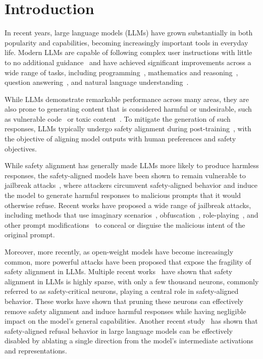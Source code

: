 \section{Introduction}

In recent years, large language models (LLMs) have grown substantially in both popularity and capabilities, becoming increasingly important tools in everyday life. Modern LLMs are capable of following complex user instructions with little to no additional guidance~\cite{brown2020fewshotlearners, wei2022finetuned} and have achieved significant improvements across a wide range of tasks, including programming~\cite{Chen2021EvaluatingLL}, mathematics and reasoning~\cite{mathds, cot}, question answering~\cite{brown2020fewshotlearners}, and natural language understanding~\cite{bert}.

While LLMs demonstrate remarkable performance across many areas, they are also prone to generating content that is considered harmful or undesirable, such as vulnerable code~\cite{pearce2022copilot} or toxic content~\cite{gehman2020realtoxicityprompts, bot}. To mitigate the generation of such responses, LLMs typically undergo safety alignment during post-training~\cite{tulu3, ouyang2022rlhf, rafailov2023dpo}, with the objective of aligning model outputs with human preferences and safety objectives.

While safety alignment has generally made LLMs more likely to produce harmless responses, the safety-aligned models have been shown to remain vulnerable to jailbreak attacks~\cite{dan2024, zou2023GCG, liu2024autodan, andriushchenko2025simpleadaptive, ding2023renellm}, where attackers circumvent safety-aligned behavior and induce the model to generate harmful responses to malicious prompts that it would otherwise refuse.
Recent works have proposed a wide range of jailbreak attacks, including methods that use imaginary scenarios~\cite{dan2024, dualuse, chao2025pair}, obfuscation~\cite{dualuse}, role-playing~\cite{johnny2024}, and other prompt modifications~\cite{xie2025sorrybench} to conceal or disguise the malicious intent of the original prompt.

Moreover, more recently, as open-weight models have become increasingly common, more powerful attacks have been proposed that expose the fragility of safety alignment in LLMs. Multiple recent works~\cite{wu2026neurostrike, twinbreak, wei2024brittleness} have shown that safety alignment in LLMs is highly sparse, with only a few thousand neurons, commonly referred to as safety-critical neurons, playing a central role in safety-aligned behavior. These works have shown that pruning these neurons can effectively remove safety alignment and induce harmful responses while having negligible impact on the model's general capabilities.
Another recent study~\cite{arditi2024refusal} has shown that safety-aligned refusal behavior in large language models can be effectively disabled by ablating a single direction from the model's intermediate activations and representations.%


